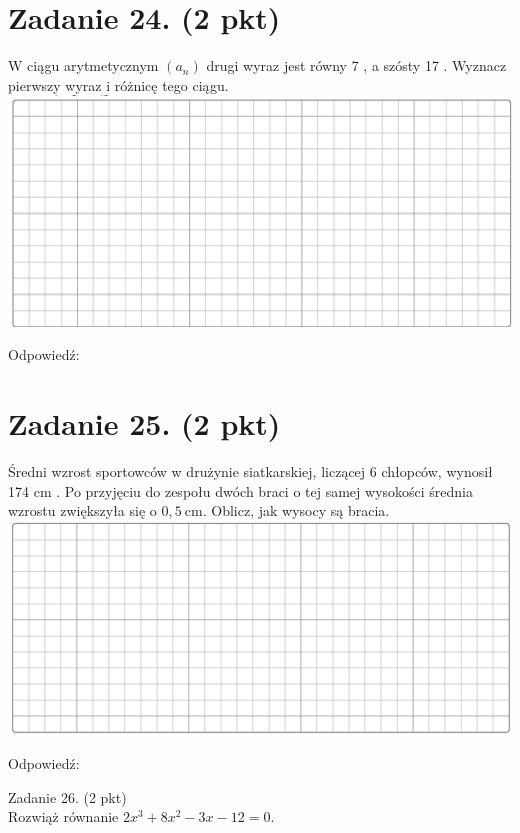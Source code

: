 \documentclass[10pt]{article}
\begin{document}
\section*{Zadanie 24. (2 pkt)}
W ciągu arytmetycznym \(\left(a_{n}\right)\) drugi wyraz jest równy 7 , a szósty 17 . Wyznacz pierwszy wyraz i różnicę tego ciągu.\\
\includegraphics[max width=\textwidth, center]{2024_11_21_a38d702bc7be8115942cg-08}

Odpowiedź:

\section*{Zadanie 25. (2 pkt)}
Średni wzrost sportowców w drużynie siatkarskiej, liczącej 6 chłopców, wynosił 174 cm . Po przyjęciu do zespołu dwóch braci o tej samej wysokości średnia wzrostu zwiększyła się o \(0,5 \mathrm{~cm}\). Oblicz, jak wysocy są bracia.\\
\includegraphics[max width=\textwidth, center]{2024_11_21_a38d702bc7be8115942cg-08(1)}

Odpowiedź:

Zadanie 26. (2 pkt)\\
Rozwiąż równanie \(2 x^{3}+8 x^{2}-3 x-12=0\).
\end{document}
